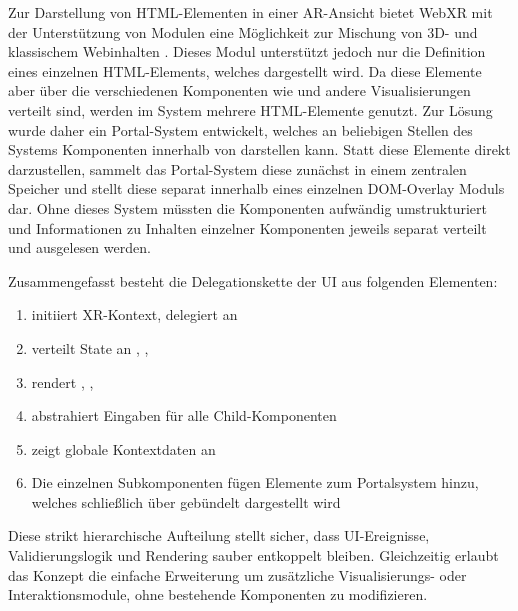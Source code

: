Zur Darstellung von HTML-Elementen in einer AR-Ansicht bietet WebXR mit der Unterstützung von  Modulen eine Möglichkeit zur Mischung von 3D- und klassischem Webinhalten \parencite{w3cWebXRDOMOverlays2025}. Dieses Modul unterstützt jedoch nur die Definition eines einzelnen HTML-Elements, welches dargestellt wird. Da diese Elemente aber über die verschiedenen Komponenten wie  und andere Visualisierungen verteilt sind, werden im System mehrere HTML-Elemente genutzt. Zur Lösung wurde daher ein Portal-System entwickelt, welches an beliebigen Stellen des Systems Komponenten innerhalb von  darstellen kann. Statt diese Elemente direkt darzustellen, sammelt das Portal-System diese zunächst in einem zentralen Speicher und stellt diese separat innerhalb eines einzelnen DOM-Overlay Moduls dar. Ohne dieses System müssten die Komponenten aufwändig umstrukturiert und Informationen zu Inhalten einzelner Komponenten jeweils separat verteilt und ausgelesen werden.

\medskip

Zusammengefasst besteht die Delegationskette der UI aus folgenden Elementen:

\begin{enumerate}
  \item {} initiiert XR-Kontext, delegiert an 
  \item {} verteilt State an , , 
  \item {} rendert , , 
  \item {} abstrahiert Eingaben für alle Child-Komponenten
  \item {} zeigt globale Kontextdaten an
  \item Die einzelnen Subkomponenten fügen Elemente zum Portalsystem hinzu, welches schließlich über  gebündelt dargestellt wird
\end{enumerate}

Diese strikt hierarchische Aufteilung stellt sicher, dass UI-Ereignisse, Validierungslogik und Rendering sauber entkoppelt bleiben.  Gleichzeitig erlaubt das Konzept die einfache Erweiterung um zusätzliche Visualisierungs- oder Interaktionsmodule, ohne bestehende Komponenten zu modifizieren.

